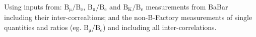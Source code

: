 \noindent Using inputs from: $\mathrm{B_\mu/B_e}$,  $\mathrm{B_\pi/B_e}$ and $\mathrm{B_K/B_e}$ measurements from BaBar including their inter-correaltions; and the non-B-Factory measurements of single quantities and ratios (eg. $\mathrm{B_\mu/B_e}$) and including all inter-correlations.
